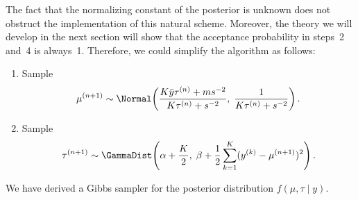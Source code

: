 The fact that the normalizing constant of the posterior is unknown does not obstruct the
implementation of this natural scheme. Moreover, the theory we will develop in the next section
will show that the acceptance probability in steps~2 and~4 is always~1. Therefore, we could
simplify the algorithm as follows:
\begin{enumerate}
  \item Sample
    \[
      \mu^{(n+1)} \sim \Normal\!\left(\frac{K\bar{y}\tau^{(n)} + ms^{-2}}{K\tau^{(n)} + s^{-2}},\;
        \frac{1}{K\tau^{(n)} + s^{-2}}\right).
    \]

  \item Sample
    \[
      \tau^{(n+1)} \sim \GammaDist\!\left(\alpha + \frac{K}{2},\;
        \beta + \frac{1}{2}\sum_{k=1}^{K}(y^{(k)} - \mu^{(n+1)})^2\right).
    \]
\end{enumerate}

We have derived a Gibbs sampler for the posterior distribution $f(\mu, \tau \mid y)$.
